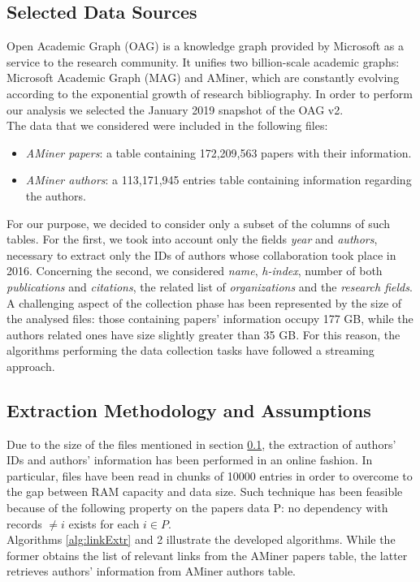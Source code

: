 \documentclass[sigchi]{acmart}
\begin{document}
\subsection{Selected Data Sources}\label{sec:dataSource}
Open Academic Graph (OAG)\cite{AMiner1}\cite{AMiner2} is a knowledge graph provided by Microsoft as a service to the research community. It unifies two billion-scale academic graphs: Microsoft Academic Graph (MAG) and AMiner, which are constantly evolving according to the exponential growth of research bibliography. In order to perform our analysis we selected the January 2019 snapshot of the OAG v2. \\
The data that we considered were included in the following files:
\begin{itemize}
\item \textit{AMiner papers}: a table containing 172,209,563 papers with their information.
\item \textit{AMiner authors}: a 113,171,945 entries table containing information regarding the authors.
\end{itemize}
For our purpose, we decided to consider only a subset of the columns of such tables. For the first, we took into account only the fields \textit{year} and \textit{authors}, necessary to extract only the IDs of authors whose collaboration took place in 2016. Concerning the second, we considered \textit{name}, \textit{h-index}, number of both \textit{publications} and \textit{citations}, the related list of \textit{organizations} and the \textit{research fields}. \\
A challenging aspect of the collection phase has been represented by the size of the analysed files: those containing papers' information occupy 177 GB, while the authors related ones have size slightly greater than 35 GB. For this reason, the algorithms performing the data collection tasks have followed a streaming approach.

\subsection{Extraction Methodology and Assumptions}
Due to the size of the files mentioned in section \ref{sec:dataSource}, the extraction of authors' IDs and authors' information has been performed in an online fashion. In particular, files have been read in chunks of 10000 entries in order to overcome to the gap between RAM capacity and data size. Such technique has been feasible because of the following property on the papers data P: no dependency with records $\neq i$ exists for each $i \in P$. \\
Algorithms \ref{alg:linkExtr} and 2 illustrate the developed algorithms. While the former obtains the list of relevant links from the AMiner papers table, the latter retrieves authors' information from AMiner authors table.
\end{document}
